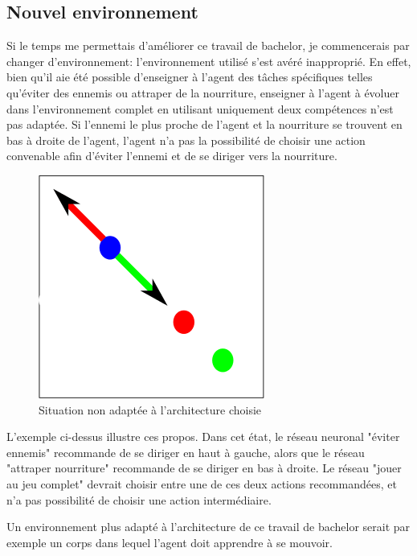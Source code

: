 \documentclass[11pt,a4paper]{report}
\begin{document}
  \subsection{Nouvel environnement}  
  
  \par Si le temps me permettais d'améliorer ce travail de bachelor, je commencerais par changer d'environnement: l'environnement utilisé s'est avéré inapproprié. En effet, bien qu'il aie été possible d'enseigner à l'agent des tâches spécifiques telles qu'éviter des ennemis ou attraper de la nourriture, enseigner à l'agent à évoluer dans l'environnement complet en utilisant uniquement deux compétences n'est pas adaptée. Si l'ennemi le plus proche de l'agent et la nourriture se trouvent en bas à droite de l'agent, l'agent n'a pas la possibilité de choisir une action convenable afin d'éviter l'ennemi et de se diriger vers la nourriture. 

   \begin{figure}[!h]
   \center
   \includegraphics[scale=0.3]{ressources/percpective.png}
   \caption{Situation non adaptée à l'architecture choisie}
   \end{figure} 

  
  \par L'exemple ci-dessus illustre ces propos. Dans cet état, le réseau neuronal "éviter ennemis" recommande de se diriger en haut à gauche, alors que le réseau  "attraper nourriture" recommande de se diriger en bas à droite. Le réseau "jouer au jeu complet" devrait choisir entre une de ces deux actions recommandées, et n'a pas possibilité de choisir une action intermédiaire. 
  
  \par Un environnement plus adapté à l'architecture de ce travail de bachelor serait par exemple un corps dans lequel l'agent doit apprendre à se mouvoir. 
  
\end{document}
